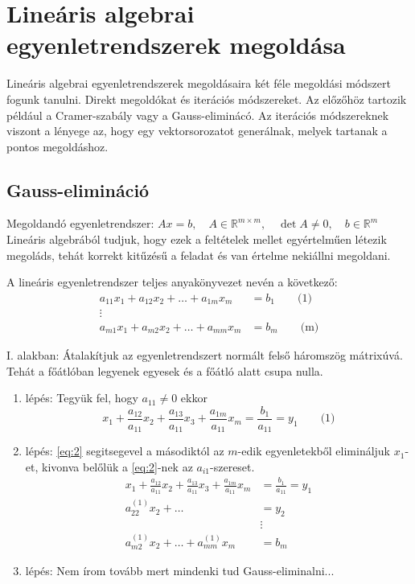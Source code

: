 \chapter{Lineáris algebrai egyenletrendszerek megoldása}
Lineáris algebrai egyenletrendszerek megoldásaira két féle megoldási módszert fogunk tanulni. Direkt megoldókat és iterációs módszereket. Az előzőhöz tartozik például a Cramer-szabály vagy a Gauss-eliminácó. Az iterációs módszereknek viszont a lényege az, hogy egy vektorsorozatot generálnak, melyek tartanak a pontos megoldáshoz.

\section{Gauss-elimináció}
Megoldandó egyenletrendszer: $Ax = b, \quad A \in \mathbb{R}^{m \times m}, \quad \det A \neq 0, \quad b \in \mathbb{R}^{m}$ \\
Lineáris algebrából tudjuk, hogy ezek a feltételek mellet egyértelműen létezik megoláds, tehát korrekt kitűzésű a feladat és van értelme nekiállni megoldani.

A lineáris egyenletrendszer teljes anyakönyvezet nevén a következő:
\begin{align*}
    a_{11}x_{1} + a_{12}x_{2} + \dots + a_{1m}x_{m} & = b_{1} \qquad \text{(1)} \\
    \vdots & \\
    a_{m 1}x_{1} + a_{m 2}x_{2} + \dots + a_{m m}x_{m} & = b_{m} \qquad \text{(m)}
\end{align*}

I. alakban: Átalakítjuk az egyenletrendszert normált felső háromszög mátrixúvá. Tehát a főátlóban legyenek egyesek és a főátló alatt csupa nulla.

\begin{enumerate}
    \item lépés: Tegyük fel, hogy $a_{11} \neq 0$ ekkor
    \begin{equation}\label{eq:2}
        x_{1} + \frac{a_{12}}{a_{11}}x_{2} + \frac{a_{13}}{a_{11}}x_{3} + \frac{a_{1m}}{a_{11}}x_{m} = \frac{b_{1}}{a_{11}} = y_{1} \qquad \text{(1)}
    \end{equation}

    \item lépés: \ref{eq:2} segitsegevel a másodiktól az $m$-edik egyenletekből elimináljuk $x_{1}$-et, kivonva belőlük a \ref{eq:2}-nek az $a_{i 1}$-szereset.
    \begin{align*}
    x_{1} + \frac{a_{12}}{a_{11}}x_{2} + \frac{a_{13}}{a_{11}}x_{3} + \frac{a_{1m}}{a_{11}}x_{m} & =  \frac{b_{1}}{a_{11}} = y_{1} \\
        a_{22}^{(1)}x_{2}  + \dots   & =  y_{2} \\
         & \vdots \\
     a_{m 2}^{(1)}x_{2}  +  \dots + a_{m m}^{(1)}x_{m} & = b_{m}
    \end{align*}
    
    \item lépés: Nem írom tovább mert mindenki tud Gauss-eliminalni...

\end{enumerate}

